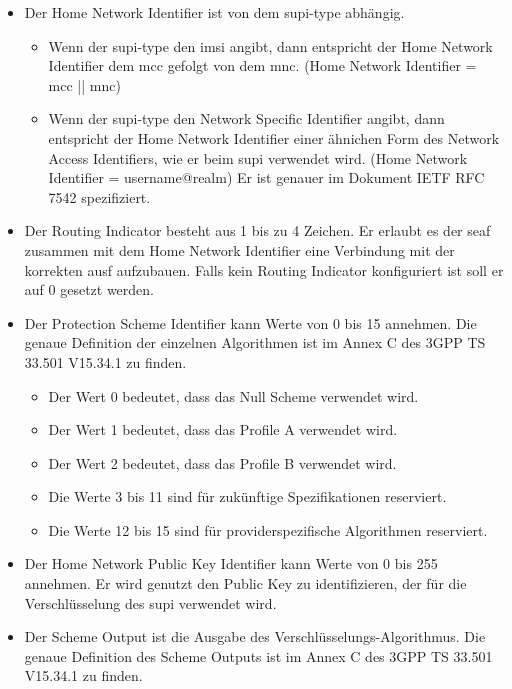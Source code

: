 \begin{itemize}
\item Der Home Network Identifier ist von dem \gls{supi-type} abh\"angig.
\begin{itemize}
\item Wenn der \gls{supi-type} den \gls{imsi} angibt, dann entspricht der Home Network Identifier dem \gls{mcc} gefolgt von dem \gls{mnc}. (Home Network Identifier = \gls{mcc} || \gls{mnc})
\item Wenn der \gls{supi-type} den Network Specific Identifier angibt, dann entspricht der Home Network Identifier einer \"ahnichen Form des Network Access Identifiers, wie er beim \gls{supi} verwendet wird. (Home Network Identifier = username@realm)
Er ist genauer im Dokument IETF RFC 7542 spezifiziert. %
\end{itemize}
\item Der Routing Indicator besteht aus 1 bis zu 4 Zeichen. %
Er erlaubt es der \gls{seaf} zusammen mit dem Home Network Identifier eine Verbindung mit der korrekten \gls{ausf} aufzubauen.
Falls kein Routing Indicator konfiguriert ist soll er auf 0 gesetzt werden.
\item Der Protection Scheme Identifier kann Werte von 0 bis 15 annehmen.
Die genaue Definition der einzelnen Algorithmen ist im Annex C des 3GPP TS 33.501 V15.34.1 zu finden. %
\begin{itemize}
\item Der Wert 0 bedeutet, dass das Null Scheme verwendet wird.
\item Der Wert 1 bedeutet, dass das Profile A verwendet wird.
\item Der Wert 2 bedeutet, dass das Profile B verwendet wird.
\item Die Werte 3 bis 11 sind f\"ur zuk\"unftige Spezifikationen reserviert.
\item Die Werte 12 bis 15 sind f\"ur providerspezifische Algorithmen reserviert.
\end{itemize}
\item Der Home Network Public Key Identifier kann Werte von 0 bis 255 annehmen.
Er wird genutzt den Public Key zu identifizieren, der f\"ur die Verschl\"usselung des \gls{supi} verwendet wird.
\item Der Scheme Output ist die Ausgabe des Verschl\"usselungs-Algorithmus.
Die genaue Definition des Scheme Outputs ist im Annex C des 3GPP TS 33.501 V15.34.1 zu finden. %
\end{itemize}

